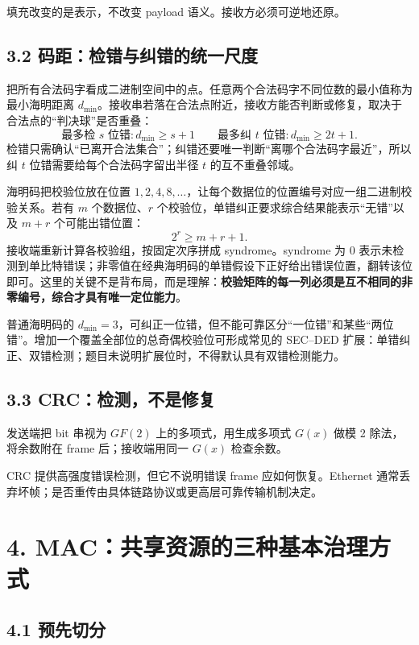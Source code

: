 \documentclass[UTF8,fontset=none,11pt,a4paper]{ctexart}
\begin{document}
填充改变的是表示，不改变 payload 语义。接收方必须可逆地还原。

\subsection{3.2 码距：检错与纠错的统一尺度}

把所有合法码字看成二进制空间中的点。任意两个合法码字不同位数的最小值称为最小海明距离 $d_{\min}$。接收串若落在合法点附近，接收方能否判断或修复，取决于合法点的“判决球”是否重叠：
\[
\boxed{\text{最多检 }s\text{ 位错}:d_{\min}\ge s+1}
\qquad
\boxed{\text{最多纠 }t\text{ 位错}:d_{\min}\ge 2t+1}.
\]
检错只需确认“已离开合法集合”；纠错还要唯一判断“离哪个合法码字最近”，所以纠 $t$ 位错需要给每个合法码字留出半径 $t$ 的互不重叠邻域。

海明码把校验位放在位置 $1,2,4,8,\ldots$，让每个数据位的位置编号对应一组二进制校验关系。若有 $m$ 个数据位、$r$ 个校验位，单错纠正要求综合结果能表示“无错”以及 $m+r$ 个可能出错位置：
\[
2^r\ge m+r+1.
\]
接收端重新计算各校验组，按固定次序拼成 syndrome。syndrome 为 $0$ 表示未检测到单比特错误；非零值在经典海明码的单错假设下正好给出错误位置，翻转该位即可。这里的关键不是背布局，而是理解：\textbf{校验矩阵的每一列必须是互不相同的非零编号，综合才具有唯一定位能力}。

普通海明码的 $d_{\min}=3$，可纠正一位错，但不能可靠区分“一位错”和某些“两位错”。增加一个覆盖全部位的总奇偶校验位可形成常见的 SEC--DED 扩展：单错纠正、双错检测；题目未说明扩展位时，不得默认具有双错检测能力。

\subsection{3.3 CRC：检测，不是修复}\label{32-crcux68c0ux6d4bux4e0dux662fux4feeux590d}

发送端把 bit 串视为 \(GF(2)\) 上的多项式，用生成多项式 \(G(x)\) 做模 2
除法，将余数附在 frame 后；接收端用同一 \(G(x)\) 检查余数。

CRC 提供高强度错误检测，但它不说明错误 frame 应如何恢复。Ethernet
通常丢弃坏帧；是否重传由具体链路协议或更高层可靠传输机制决定。

\section{4.
MAC：共享资源的三种基本治理方式}\label{4-macux5171ux4eabux8d44ux6e90ux7684ux4e09ux79cdux57faux672cux6cbbux7406ux65b9ux5f0f}

\subsection{4.1 预先切分}\label{41-ux9884ux5148ux5207ux5206}
\end{document}
